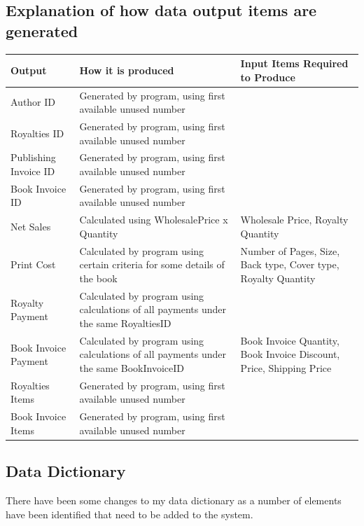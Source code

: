 \subsection{Explanation of how data output items are generated}

\begin{center}
\begin{tabular}{|p{3cm}|p{4cm}|p{3cm}|}
    \hline
    \textbf{Output} & \textbf{How it is produced} & \textbf{Input Items Required to Produce} \\ \hline
    Author ID & Generated by program, using first available unused number & \\ \hline
    Royalties ID & Generated by program, using first available unused number & \\ \hline
    Publishing Invoice ID & Generated by program, using first available unused number & \\ \hline
    Book Invoice ID & Generated by program, using first available unused number & \\ \hline
    Net Sales & Calculated using WholesalePrice x Quantity & Wholesale Price, Royalty Quantity \\ \hline
    Print Cost & Calculated by program using certain criteria for some details of the book & Number of Pages, Size, Back type, Cover type, Royalty Quantity \\ \hline
    Royalty Payment & Calculated by program using calculations of all payments under the same RoyaltiesID & \\ \hline
    Book Invoice Payment & Calculated by program using calculations of all payments under the same BookInvoiceID & Book Invoice Quantity, Book Invoice Discount, Price, Shipping Price \\ \hline
    Royalties Items &  Generated by program, using first available unused number & \\ \hline
    Book Invoice Items &  Generated by program, using first available unused number & \\ \hline
\end{tabular}
\end{center}


\subsection{Data Dictionary} \label{ssec:DesignDataDictionary}

There have been some changes to my data dictionary as a number of elements have been identified that need to be added to the system.

